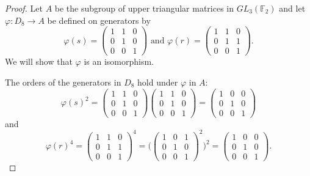 \documentclass{article}
\begin{document}
\begin{proof}
    Let $A$ be the subgroup of upper triangular matrices in $GL_3(\mathbb{F}_2)$ and let $\varphi: D_8 \rightarrow A$ be defined on generators by
    \begin{equation*}
        \varphi(s) = \begin{pmatrix}1 & 1 & 0 \\ 0 & 1 & 0 \\ 0 & 0 & 1\end{pmatrix} \text{ and } \varphi(r) = \begin{pmatrix}1 & 1 & 0 \\ 0 & 1 & 1 \\ 0 & 0 & 1\end{pmatrix}.
    \end{equation*}
    We will show that $\varphi$ is an isomorphism.

    The orders of the generators in $D_8$ hold under $\varphi$ in $A$:
    \begin{equation*}
        \varphi(s)^2 = \begin{pmatrix}1 & 1 & 0 \\ 0 & 1 & 0 \\ 0 & 0 & 1\end{pmatrix}\begin{pmatrix}1 & 1 & 0 \\ 0 & 1 & 0 \\ 0 & 0 & 1\end{pmatrix} = \begin{pmatrix}1 & 0 & 0 \\ 0 & 1 & 0 \\ 0 & 0 & 1\end{pmatrix}
    \end{equation*}
    and
    \begin{equation*}
        \varphi(r)^4 = \begin{pmatrix}1 & 1 & 0 \\ 0 & 1 & 1 \\ 0 & 0 & 1\end{pmatrix}^4 = \Biggl(\begin{pmatrix}1 & 0 & 1 \\ 0 & 1 & 0 \\ 0 & 0 & 1\end{pmatrix}^2\Biggr)^2 = \begin{pmatrix}1 & 0 & 0 \\ 0 & 1 & 0 \\ 0 & 0 & 1\end{pmatrix}.
    \end{equation*}


\end{proof}
\end{document}
